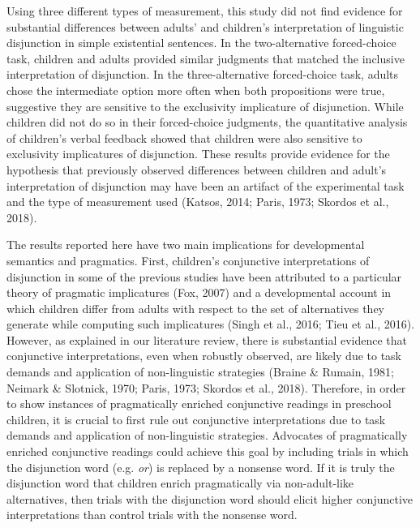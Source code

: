 \documentclass[,man,floatsintext]{apa6}
\begin{document}
Using three different types of measurement, this study did not find evidence for substantial differences between adults' and children's interpretation of linguistic disjunction in simple existential sentences. In the two-alternative forced-choice task, children and adults provided similar judgments that matched the inclusive interpretation of disjunction. In the three-alternative forced-choice task, adults chose the intermediate option more often when both propositions were true, suggestive they are sensitive to the exclusivity implicature of disjunction. While children did not do so in their forced-choice judgments, the quantitative analysis of children's verbal feedback showed that children were also sensitive to exclusivity implicatures of disjunction. These results provide evidence for the hypothesis that previously observed differences between children and adult's interpretation of disjunction may have been an artifact of the experimental task and the type of measurement used (Katsos, 2014; Paris, 1973; Skordos et al., 2018).

The results reported here have two main implications for developmental semantics and pragmatics. First, children's conjunctive interpretations of disjunction in some of the previous studies have been attributed to a particular theory of pragmatic implicatures (Fox, 2007) and a developmental account in which children differ from adults with respect to the set of alternatives they generate while computing such implicatures (Singh et al., 2016; Tieu et al., 2016). However, as explained in our literature review, there is substantial evidence that conjunctive interpretations, even when robustly observed, are likely due to task demands and application of non-linguistic strategies (Braine \& Rumain, 1981; Neimark \& Slotnick, 1970; Paris, 1973; Skordos et al., 2018). Therefore, in order to show instances of pragmatically enriched conjunctive readings in preschool children, it is crucial to first rule out conjunctive interpretations due to task demands and application of non-linguistic strategies. Advocates of pragmatically enriched conjunctive readings could achieve this goal by including trials in which the disjunction word (e.g. \emph{or}) is replaced by a nonsense word. If it is truly the disjunction word that children enrich pragmatically via non-adult-like alternatives, then trials with the disjunction word should elicit higher conjunctive interpretations than control trials with the nonsense word.
\end{document}
